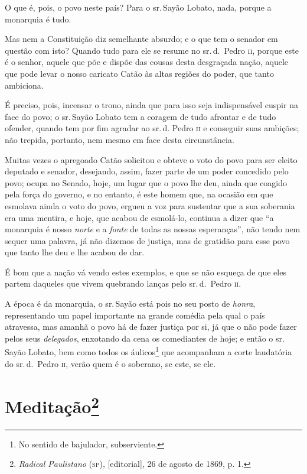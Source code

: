 O que é, pois, o povo neste país? Para o sr.\,Sayão Lobato, nada, porque
a monarquia é tudo.

Mas nem a Constituição diz semelhante absurdo; e o que tem o senador em
questão com isto? Quando tudo para ele se resume no sr.\,d.~Pedro \textsc{ii},
porque este é o senhor, aquele que põe e dispõe das cousas desta
desgraçada nação, aquele que pode levar o nosso caricato Catão às altas
regiões do poder, que tanto ambiciona.

É preciso, pois, incensar o trono, ainda que para isso seja
indispensável cuspir na face do povo; o sr.\,Sayão Lobato tem a coragem
de tudo afrontar e de tudo ofender, quando tem por fim agradar ao sr.\,d.
Pedro \textsc{ii} e conseguir suas ambições; não trepida, portanto, nem mesmo em
face desta circunstância.

Muitas vezes o apregoado Catão solicitou e obteve o voto do povo para
ser eleito deputado e senador, desejando, assim, fazer parte de um poder
concedido pelo povo; ocupa no Senado, hoje, um lugar que o povo lhe deu,
ainda que coagido pela força do governo, e no entanto, é este homem que,
na ocasião em que esmolava ainda o voto do povo, ergueu a voz para
sustentar que a sua soberania era uma mentira, e hoje, que acabou de
esmolá-lo, continua a dizer que ``a monarquia é nosso \emph{norte} e a
\emph{fonte} de todas as nossas esperanças'', não tendo nem sequer uma
palavra, já não dizemos de justiça, mas de gratidão para esse povo que
tanto lhe deu e lhe acabou de dar.

É bom que a nação vá vendo estes exemplos, e que se não esqueça de que
eles partem daqueles que vivem quebrando lanças pelo sr.\,d.~Pedro \textsc{ii}.

A época é da monarquia, o sr.\,Sayão está pois no seu posto de
\emph{honra}, representando um papel importante na grande comédia pela
qual o país atravessa, mas amanhã o povo há de fazer justiça por si, já
que o não pode fazer pelos seus \emph{delegados}, enxotando da cena os
comediantes de hoje; e então o sr.\,Sayão Lobato, bem como todos os
áulicos\footnote{No sentido de bajulador, subserviente.} que
acompanham a corte laudatória do sr.\,d.~Pedro \textsc{ii}, verão quem é o
soberano, se este, se ele.

\chapter{Meditação\footnote{\emph{Radical Paulistano} (\textsc{sp}),
  {[}editorial{]}, 26 de agosto de 1869, p. 1.}}

